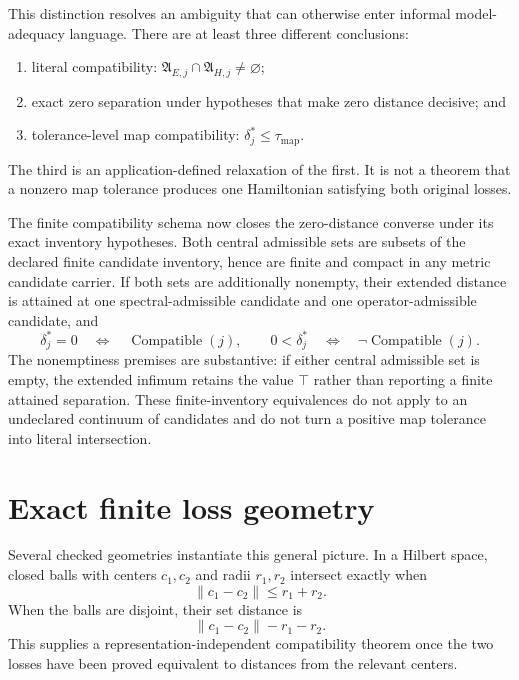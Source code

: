 This distinction resolves an ambiguity that can otherwise enter informal model-
adequacy language.  There are at least three different conclusions:

\begin{enumerate}
  \item literal compatibility: $\mathfrak A_{E,j}\cap\mathfrak A_{H,j}\neq\varnothing$;
  \item exact zero separation under hypotheses that make zero distance decisive; and
  \item tolerance-level map compatibility:
        $\delta_j^*\leq\tau_{\mathrm{map}}$.
\end{enumerate}

The third is an application-defined relaxation of the first.  It is not a theorem that
a nonzero map tolerance produces one Hamiltonian satisfying both original losses.

The finite compatibility schema now closes the zero-distance converse under its exact
inventory hypotheses.  Both central admissible sets are subsets of the declared finite
candidate inventory, hence are finite and compact in any metric candidate carrier.  If
both sets are additionally nonempty, their extended distance is attained at one
spectral-admissible candidate and one operator-admissible candidate, and
\[
  \delta_j^*=0
  \quad\Longleftrightarrow\quad
  \operatorname{Compatible}(j),
  \qquad
  0<\delta_j^*
  \quad\Longleftrightarrow\quad
  \neg\operatorname{Compatible}(j).
\]
The nonemptiness premises are substantive: if either central admissible set is empty,
the extended infimum retains the value $\top$ rather than reporting a finite attained
separation.  These finite-inventory equivalences do not apply to an undeclared continuum
of candidates and do not turn a positive map tolerance into literal intersection.

\section{Exact finite loss geometry}

Several checked geometries instantiate this general picture.  In a Hilbert space,
closed balls with centers $c_1,c_2$ and radii $r_1,r_2$ intersect exactly when
\[
  \lVert c_1-c_2\rVert\leq r_1+r_2.
\]
When the balls are disjoint, their set distance is
\[
  \lVert c_1-c_2\rVert-r_1-r_2.
\]
This supplies a representation-independent compatibility theorem once the two losses
have been proved equivalent to distances from the relevant centers.

